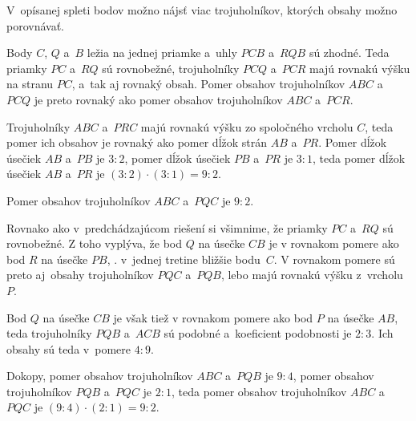 {%
\napad
V~opísanej spleti bodov možno nájsť viac trojuholníkov, ktorých obsahy možno porovnávať.

\riesenie
Body $C$, $Q$ a~$B$ ležia na jednej priamke a~uhly $PCB$ a~$RQB$ sú zhodné.
Teda priamky $PC$ a~$RQ$ sú rovnobežné, trojuholníky $PCQ$ a~$PCR$ majú rovnakú výšku na stranu $PC$, a~tak aj rovnaký obsah.
Pomer obsahov trojuholníkov $ABC$ a~$PCQ$ je preto rovnaký ako pomer obsahov trojuholníkov $ABC$ a~$PCR$.
%


Trojuholníky $ABC$ a~$PRC$ majú rovnakú výšku zo spoločného vrcholu $C$, teda pomer ich obsahov je rovnaký ako pomer dĺžok strán $AB$ a~$PR$.
Pomer dĺžok úsečiek $AB$ a~$PB$ je $3:2$, pomer dĺžok úsečiek $PB$ a~$PR$ je $3:1$, teda pomer dĺžok úsečiek $AB$ a~$PR$ je $(3:2)\cdot(3:1)=9:2$.

Pomer obsahov trojuholníkov $ABC$ a~$PQC$ je $9:2$.

\ineriesenie
Rovnako ako v~predchádzajúcom riešení si všimnime, že priamky $PC$ a~$RQ$ sú rovnobežné.
Z toho vyplýva, že bod $Q$ na úsečke $CB$ je v rovnakom pomere ako bod $R$ na úsečke $PB$, \tj. v~jednej tretine bližšie bodu~$C$.
V rovnakom pomere sú preto aj~obsahy trojuholníkov $PQC$ a~$PQB$, lebo majú rovnakú výšku z~vrcholu $P$.
%


Bod $Q$ na úsečke $CB$ je však tiež v rovnakom pomere ako bod $P$ na úsečke $AB$, teda trojuholníky $PQB$ a~$ACB$ sú podobné a~koeficient podobnosti je $2:3$.
Ich obsahy sú teda v~pomere $4:9$.

Dokopy,
pomer obsahov trojuholníkov $ABC$ a~$PQB$ je $9:4$,
pomer obsahov trojuholníkov $PQB$ a~$PQC$ je $2:1$,
teda pomer obsahov trojuholníkov $ABC$ a~$PQC$ je $(9:4)\cdot(2:1)=9:2$.
}

